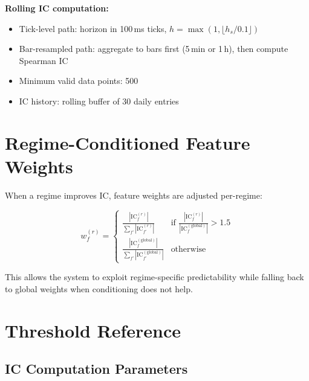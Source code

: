\documentclass[11pt,a4paper]{article}
\begin{document}
\textbf{Rolling IC computation:}
\begin{itemize}    \item Tick-level path: horizon in 100\,ms ticks,
        $h = \max(1, \lfloor h_s / 0.1 \rfloor)$
    \item Bar-resampled path: aggregate to bars first (5\,min or 1\,h),
        then compute Spearman IC
    \item Minimum valid data points: 500
    \item IC history: rolling buffer of 30 daily entries
\end{itemize}

\section{Regime-Conditioned Feature Weights}

When a regime improves IC, feature weights are adjusted per-regime:

\begin{equation}
    w_f^{(r)} = \begin{cases}
        \displaystyle\frac{|\mathrm{IC}_f^{(r)}|}
            {\sum_{f'} |\mathrm{IC}_{f'}^{(r)}|}
        & \text{if } \displaystyle\frac{|\mathrm{IC}_f^{(r)}|}
            {|\mathrm{IC}_f^{(\mathrm{global})}|} > 1.5 \\[12pt]
        \displaystyle\frac{|\mathrm{IC}_f^{(\mathrm{global})}|}
            {\sum_{f'} |\mathrm{IC}_{f'}^{(\mathrm{global})}|}
        & \text{otherwise}
    \end{cases}
    \label{eq:regime_weights}
\end{equation}

This allows the system to exploit regime-specific predictability while
falling back to global weights when conditioning does not help.

\section{Threshold Reference}

\subsection{IC Computation Parameters}
\end{document}
